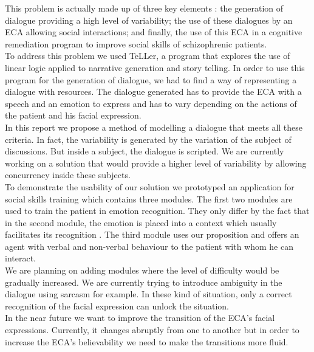 \documentclass[11pt]{article}
\begin{document}
This problem is actually made up of three key elements : the generation of dialogue providing a high level of variability; the use of these dialogues by an ECA allowing social interactions; and finally, the use of this ECA in a cognitive remediation program to improve social skills of schizophrenic patients.\\

To address this problem we used TeLLer, a program that explores the use of linear logic applied to narrative generation and story telling. In order to use this program for the generation of dialogue, we had to find a way of representing a dialogue with resources. The dialogue generated has to provide the ECA with a speech and an emotion to express and has to vary depending on the actions of the patient and his facial expression. \\

In this report we propose a method of modelling a dialogue that meets all these criteria. In fact, the variability is generated by the variation of the subject of discussions. But inside a subject, the dialogue is scripted. We are currently working on a solution that would provide a higher level of variability by allowing concurrency inside these subjects. \\

To demonstrate the usability of our solution we prototyped an application for social skills training which contains three modules. The first two modules are used to train the patient in emotion recognition. They only differ by the fact that in the second module, the emotion is placed into a context which usually facilitates its recognition \citep{Lee13}. The third module uses our proposition and offers an agent with verbal and non-verbal behaviour to the patient with whom he can interact.\\

We are planning on adding modules where the level of difficulty would be gradually increased. We are currently trying to introduce ambiguity in the dialogue using sarcasm for example. In these kind of situation, only a correct recognition of the facial expression can unlock the situation.  \\

In the near future we want to improve the transition of the ECA's facial expressions. Currently, it changes abruptly from one to another but in order to increase the ECA's believability we need to make the transitions more fluid.\\
\end{document}
